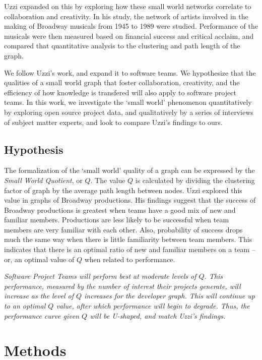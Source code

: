 \documentclass{proc}
\begin{document}
Uzzi \cite{uzzi2005collaboration} expanded on this by exploring how these small world networks correlate to collaboration and creativity. In his study, the network of artists involved in the making of Broadway musicals from 1945 to 1989 were studied. Performance of the musicals were then measured based on financial success and critical acclaim, and compared that quantitative analysis to the clustering and path length of the graph.

We follow Uzzi's work, and expand it to software teams. We hypothesize that the qualities of a small world graph that foster collaboration, creativity, and the efficiency of how knowledge is transfered\cite{latora2001efficient} will also apply to software project teams. In this work, we investigate the `small world' phenomenon quantitatively by exploring open source project data, and qualitatively by a series of interviews of subject matter experts, and look to compare Uzzi's findings to ours.


\subsection{Hypothesis}
The formalization of the `small world' quality of a graph can be expressed by the \textit{Small World Quotient}, or $Q$\cite{watts1999small,watts1998collective}. The value $Q$ is calculated by dividing the clustering factor of graph by the average path length between nodes. Uzzi explored this value in graphs of Broadway productions\cite{uzzi2005collaboration}. His findings suggest that the success of Broadway productions is greatest when teams have a good mix of new and familiar members. Productions are less likely to be successful when team members are very familiar with each other. Also, probability of success drops much the same way when there is little familiarity between team members. This indicates that there is an optimal ratio of new and familiar members on a team -- or, an optimal value of $Q$ when related to performance.

\textit{Software Project Teams will perform best at moderate levels of $Q$. This performance, measured by the number of interest their projects generate, will increase as the level of $Q$ increases for the developer graph. This will continue up to an optimal $Q$ value, after which performance will begin to degrade. Thus, the performance curve given $Q$ will be U-shaped, and match Uzzi's findings\cite{uzzi2005collaboration}.}

\section{Methods}
\end{document}
